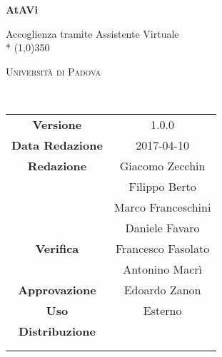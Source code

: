 \documentclass[a4paper,12pt]{article}
\date{2017/04/10}
\begin{document}
	\begin{titlepage}
		\centering
		{\huge\bfseries AtAVi\par}
		Accoglienza tramite Assistente Virtuale \\*
		\line(1,0){350} \\
		{\scshape\LARGE Università di Padova \par}
		\vspace{1cm}
		{\scshape\Large \manualesviluppatoreRQ\ \par}
		\logo
		\newpage
		\begin{tabular}{c|c}
			{\hfill \textbf{Versione}} 			& 1.0.0			\\ 
			{\hfill\textbf{Data Redazione}} 	& 2017-04-10 		\\ 
			{\hfill\textbf{Redazione}} 			& Giacomo Zecchin \\ & Filippo Berto \\ & Marco Franceschini \\ & Daniele Favaro \\
			{\hfill\textbf{Verifica}} 			& Francesco Fasolato \\ & Antonino Macrì \\
			{\hfill\textbf{Approvazione}} 		& Edoardo Zanon \\
			{\hfill\textbf{Uso}} 				& Esterno 			\\
			{\hfill\textbf{Distribuzione}} 		& \vardanega \\ & \cardin \\ & \prop \\
		\end{tabular}
	\end{titlepage}
	
	\pagestyle{myfront}
	\newpage	
			

	\newpage
		\tableofcontents 	%
	\newpage
		\listoftables 		%
	\newpage	
		\listoffigures		%
	
	\label{LastFrontPage}
		\newpage
		\pagestyle{mymain}
		
		\newpage
		
		\newpage
		
		\newpage
		
		\newpage
		
		\newpage
		
		\newpage
		
		\newpage
		
		\newpage
		

		\glsaddall	%
		\newpage

			\printglossary[style=myaltlistgroup] %

	\label{LastPage}
\end{document}

